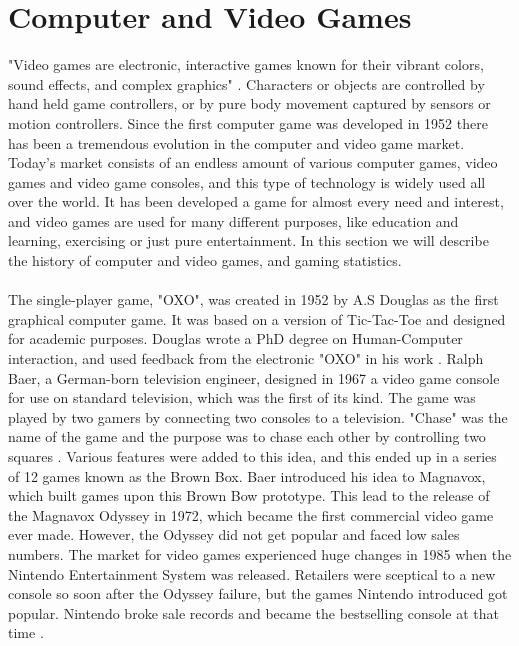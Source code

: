 \section{Computer and Video Games}
"Video games are electronic, interactive games known for their vibrant colors, sound effects, and complex graphics" \cite{videogamedef}. Characters or objects are controlled by hand held game controllers, or by pure body movement captured by sensors or motion controllers. Since the first computer game was developed in 1952 there has been a tremendous evolution in the computer and video game market. Today's market consists of an endless amount of various computer games, video games and video game consoles, and this type of technology is widely used all over the world. It has been developed a game for almost every need and interest, and video games are used for many different purposes, like education and learning, exercising or just pure entertainment. In this section we will describe the history of computer and video games, and gaming statistics. \\ \\
The single-player game, "OXO", was created in 1952 by A.S Douglas as the first graphical computer game. It was based on a version of Tic-Tac-Toe and designed for academic purposes.  Douglas wrote a PhD degree on Human-Computer interaction, and used feedback from the electronic "OXO" in his work \cite{abouthiginbotham}. Ralph Baer, a German-born television engineer, designed in 1967 a video game console for use on standard television, which was the first of its kind. The game was played by two gamers by connecting two consoles to a television. "Chase" was the name of the game and the purpose was to chase each other by controlling two squares \cite{videogameHistory}. Various features were added to this idea, and this ended up in a series of 12 games known as the Brown Box. Baer introduced his idea to Magnavox, which built games upon this Brown Bow prototype. This lead to the release of the Magnavox Odyssey in 1972, which became the first commercial video game ever made. However, the Odyssey did not get popular and faced low sales numbers. The market for video games experienced huge changes in 1985 when the Nintendo Entertainment System was released. Retailers were sceptical to a new console so soon after the Odyssey failure, but the games Nintendo introduced got popular. Nintendo broke sale records and became the bestselling console at that time \cite{consoleHistory}. \\ \\
